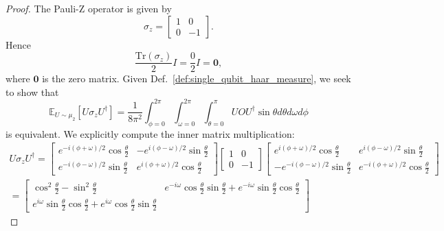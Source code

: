\begin{proof}
The Pauli-Z operator is given by
\begin{equation}
    \sigma_{z} = \begin{bmatrix} 1 & 0 \\ 0 & -1 \end{bmatrix}.
\end{equation}
Hence
\begin{equation}
    \frac{\text{Tr}(\sigma_{z})}{2}I = \frac{0}{2} I = \mathbf{0},
\end{equation}
where $\mathbf{0}$ is the zero matrix.
Given Def.~\ref{def:single_qubit_haar_measure}, we seek to show that
\begin{equation}
    \mathbb{E}_{U \sim \mu_{2}} [U\sigma_{z}U^{\dagger}] = \frac{1}{8\pi^2}\int_{\phi = 0}^{2\pi} \int_{\omega = 0}^{2\pi} \int_{\theta = 0}^{\pi} UOU^{\dagger} \sin \theta d\theta d\omega d\phi
\end{equation}
is equivalent.
We explicitly compute the inner matrix multiplication:
\begin{equation}
\begin{split}
    U\sigma_{z} U^{\dagger} = \begin{bmatrix}
            e^{-i (\phi + \omega) / 2} \cos{\frac{\theta}{2}} & -e^{i (\phi - \omega) / 2} \sin{\frac{\theta}{2}}\\
            e^{-i (\phi - \omega) / 2} \sin{\frac{\theta}{2}} & e^{i (\phi + \omega) / 2} \cos{\frac{\theta}{2}}
        \end{bmatrix} \begin{bmatrix} 1 & 0 \\ 0 & -1 \end{bmatrix}
        \begin{bmatrix}
        e^{i( \phi + \omega) / 2} \cos{\frac{\theta}{2}} & e^{i (\phi - \omega) / 2} \sin{\frac{\theta}{2}}\\
        - e^{-i (\phi - \omega) / 2} \sin{\frac{\theta}{2}} & e^{-i(\phi + \omega)/ 2} \cos{\frac{\theta}{2}} \end{bmatrix}\\
        = \begin{bmatrix}
            \cos^{2}{\frac{\theta}{2}} - \sin^{2}{\frac{\theta}{2}}
            & e^{-i \omega} \cos{\frac{\theta}{2}} \sin{\frac{\theta}{2}} + e^{-i\omega} \sin{\frac{\theta}{2}} \cos{\frac{\theta}{2}}\\
            e^{i \omega} \sin{\frac{\theta}{2}} \cos{\frac{\theta}{2}} + e^{i \omega} \cos{\frac{\theta}{2}} \sin{\frac{\theta}{2}}

\end{bmatrix}
\end{split}
\end{equation}
\end{proof}
